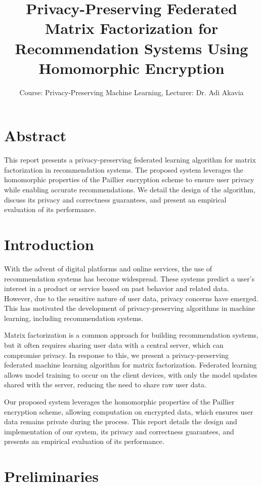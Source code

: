 \documentclass{article}
\title{Privacy-Preserving Federated Matrix Factorization for Recommendation Systems Using Homomorphic Encryption}
\author{Course: Privacy-Preserving Machine Learning, Lecturer: Dr. Adi Akavia}
\begin{document}
\maketitle

\section{Abstract}

This report presents a privacy-preserving federated learning algorithm for matrix factorization in recommendation systems. The proposed system leverages the homomorphic properties of the Paillier encryption scheme to ensure user privacy while enabling accurate recommendations. We detail the design of the algorithm, discuss its privacy and correctness guarantees, and present an empirical evaluation of its performance.


\section{Introduction}

With the advent of digital platforms and online services, the use of recommendation systems has become widespread. These systems predict a user's interest in a product or service based on past behavior and related data. However, due to the sensitive nature of user data, privacy concerns have emerged. This has motivated the development of privacy-preserving algorithms in machine learning, including recommendation systems.

Matrix factorization is a common approach for building recommendation systems, but it often requires sharing user data with a central server, which can compromise privacy. In response to this, we present a privacy-preserving federated machine learning algorithm for matrix factorization. Federated learning allows model training to occur on the client devices, with only the model updates shared with the server, reducing the need to share raw user data.

Our proposed system leverages the homomorphic properties of the Paillier encryption scheme, allowing computation on encrypted data, which ensures user data remains private during the process. This report details the design and implementation of our system, its privacy and correctness guarantees, and presents an empirical evaluation of its performance.



\section{Preliminaries}
\end{document}
